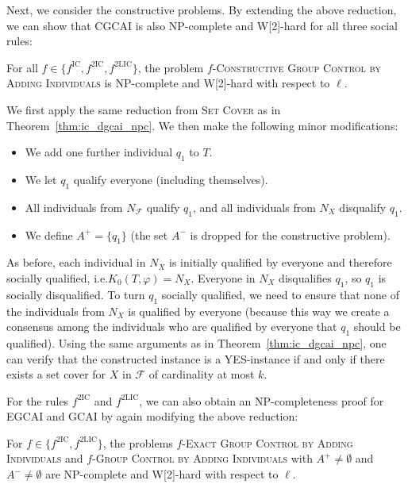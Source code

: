 \documentclass[
    12pt,               %
    a4paper,            %
    bibtotoc,           %
    pointlessnumbers,   %
    ngerman,            %
    titlepage,          %
    leqno,              %
    ]{scrarticle}       %
\newcommand\thmref{Theorem~\ref}
\begin{document}
Next, we consider the constructive problems. By extending the above reduction, we can show that CGCAI is also NP-complete and W[2]-hard for all three social rules:

\begin{Corollary} \label{cor:ic_cgcai_npc}
For all $f \in \{ f^{\text{IC}}, f^{\text{2IC}}, f^{\text{2LIC}} \}$, the problem $f$-\textsc{Constructive Group Control by Adding Individuals} is NP-complete and W[2]-hard with respect to $\ell$.
\end{Corollary}

\begin{Proof}
We first apply the same reduction from \textsc{Set Cover} as in \thmref{thm:ic_dgcai_npc}. We then make the following minor modifications:

\begin{itemize}[nolistsep]
\item
We add one further individual $q_1$ to $T$.
\item
We let $q_1$ qualify everyone (including themselves).
\item
All individuals from $N_\mathcal{F}$ qualify $q_1$, and all individuals from $N_X$ disqualify $q_1$.
\item
We define $A^+ = \{q_1\}$ (the set $A^-$ is dropped for the constructive problem).
\end{itemize}

As before, each individual in $N_X$ is initially qualified by everyone and therefore socially qualified, i.e.\@ $K_0(T, \varphi) = N_X$. Everyone in $N_X$ disqualifies $q_1$, so $q_1$ is socially disqualified. To turn $q_1$ socially qualified, we need to ensure that none of the individuals from $N_X$ is qualified by everyone (because this way we create a consensus among the individuals who are qualified by everyone that $q_1$ should be qualified). Using the same arguments as in \thmref{thm:ic_dgcai_npc}, one can verify that the constructed instance is a YES-instance if and only if there exists a set cover for $X$ in $\mathcal{F}$ of cardinality at most $k$.
\end{Proof}



For the rules $f^{\text{2IC}}$ and $f^{\text{2LIC}}$, we can also obtain an NP-completeness proof for EGCAI and GCAI by again modifying the above reduction:

\begin{Corollary} \label{cor:2ic_egcai_gcai_npc}
For $f \in \{ f^{\text{2IC}}, f^{\text{2LIC}} \}$, the problems $f$-\textsc{Exact Group Control by Adding Individuals} and $f$-\textsc{Group Control by Adding Individuals} with $A^+ \neq \emptyset$ and $A^- \neq \emptyset$ are NP-complete and W[2]-hard with respect to $\ell$.
\end{Corollary}
\end{document}
